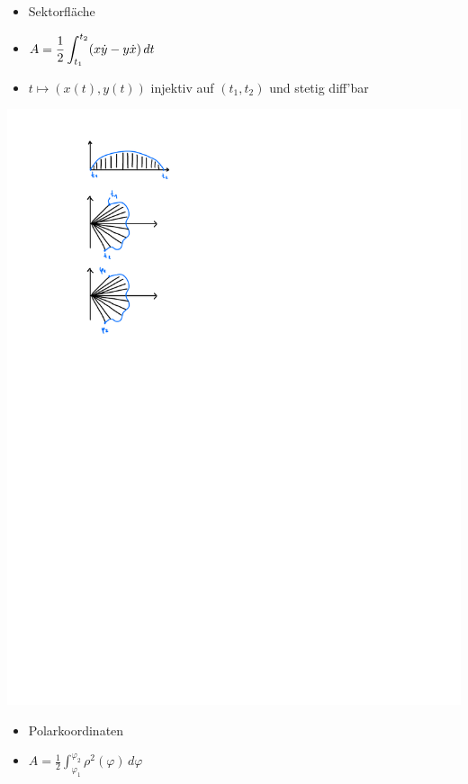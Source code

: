     \begin{minipage}{0.65\linewidth}
        \begin{itemize}
            \item Sektorfläche
            \item[]  $\displaystyle A= \frac{1}{2} \int_{t_1}^{t_2} (x \dot{y} - y \dot{x}) \, dt$ 
            \item[] $t\mapsto (x(t),y(t))$ injektiv auf $(t_1,t_2)$ und stetig diff'bar
            \end{itemize}
            \item[]
    \end{minipage}
    \begin{minipage}{0.34\linewidth}
            \includegraphics[width=0.6\linewidth]{src/Integralrechnung/sektor.pdf}
    \end{minipage}
    \begin{minipage}{0.65\linewidth}
        \begin{itemize}
            \item Polarkoordinaten
            \item[] $ \displaystyle A= \frac{1}{2} \int_{\varphi_1}^{\varphi_2} \rho^2(\varphi) \, d\varphi $
        \end{itemize}
    \end{minipage}
